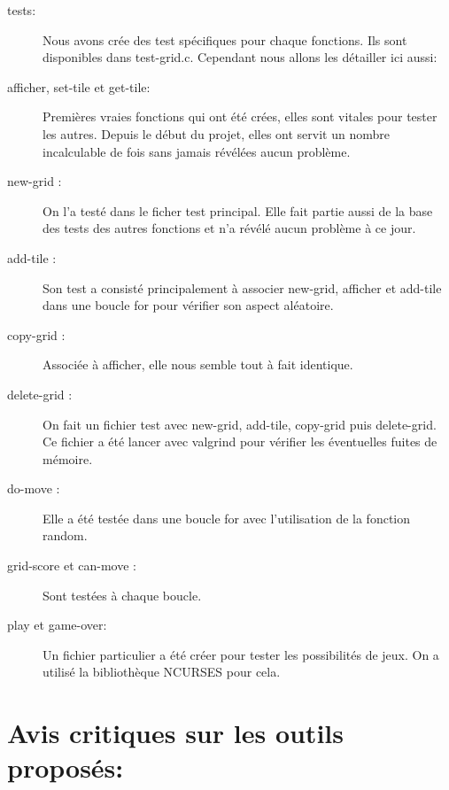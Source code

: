 \documentclass{report}
\begin{document}
\begin{description}
\item [tests:]
Nous avons crée des test spécifiques pour chaque fonctions. Ils sont disponibles dans test-grid.c. Cependant nous allons les détailler ici aussi:
\item [afficher, set-tile et get-tile:] Premières vraies fonctions qui ont été crées, elles sont vitales pour tester les autres. Depuis le début du projet, elles ont servit un nombre incalculable de fois sans jamais révélées aucun problème.\\
\item [new-grid :] On l'a test\'{e} dans le ficher test principal. Elle fait partie aussi de la base des tests des autres fonctions et n'a r\'{e}v\'{e}l\'{e} aucun probl\`{e}me \`{a} ce jour.\\
\item [add-tile :] Son test a consist\'{e} principalement \`{a} associer new-grid, afficher et add-tile dans une boucle for pour v\'{e}rifier son aspect al\'{e}atoire.\\
\item [copy-grid :]Associ\'{e}e \`{a} afficher, elle nous semble tout \`{a} fait identique.\\
\item [delete-grid :] On fait un fichier test avec new-grid, add-tile, copy-grid puis delete-grid. Ce fichier a \'{e}t\'{e} lancer avec valgrind pour v\'{e}rifier les \'{e}ventuelles fuites de m\'{e}moire.\\
\item [do-move :] Elle a \'{e}t\'{e} test\'{e}e dans une boucle for avec l'utilisation de la fonction random.\\
\item [grid-score et can-move :] Sont test\'{e}es \`{a} chaque boucle.\\

\item [play et game-over:] Un fichier particulier a \'{e}t\'{e} cr\'{e}er pour tester les possibilit\'{e}s de jeux. On a utilis\'{e} la biblioth\`{e}que NCURSES pour cela.  
\end{description}

\section*{Avis critiques sur les outils proposés:}
\end{document}
